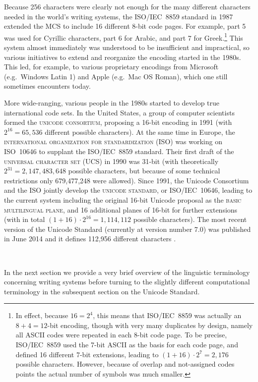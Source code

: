 Because 256 characters were clearly not enough for the many different characters
needed in the world's writing systems, the ISO/IEC~8859 standard in 1987
extended the MCS to include 16 different 8-bit code pages. For example, part 5
was used for Cyrillic characters, part 6 for Arabic, and part 7 for
Greek.\footnote{In effect, because $16 = 2^4$, this means that ISO/IEC~8859 was
actually an $8+4=12$-bit encoding, though with very many duplicates by design,
namely all ASCII codes were repeated in each 8-bit code page. To be precise,
ISO/IEC~8859 used the 7-bit ASCII as the basis for each code page, and defined
16 different 7-bit extensions, leading to $(1+16) \cdot {2^7} = 2,176$ possible
characters. However, because of overlap and not-assigned codes points the actual
number of symbols was much smaller.} This system almost immediately was
understood to be insufficient and impractical, so various initiatives to extend
and reorganize the encoding started in the 1980s. This led, for example, to
various proprietary encodings from Microsoft (e.g.~Windows Latin 1) and Apple
(e.g.~Mac OS Roman), which one still sometimes encounters today. 

More wide-ranging, various people in the 1980s started to develop true
international code sets. In the United States, a group of computer scientists
formed the \textsc{unicode consortium}, proposing a 16-bit encoding in 1991
(with $2^{16} = 65,536$ different possible characters). At the same time in
Europe, the \textsc{international organization for standardization} (ISO) was
working on ISO~10646 to supplant the ISO/IEC~8859 standard. Their first draft of
the \textsc{universal character set} (UCS) in 1990 was 31-bit (with
theoretically $2^{31} = 2,147,483,648$ possible characters, but because of some
technical restrictions only 679,477,248 were allowed). Since 1991, the Unicode
Consortium and the ISO jointly develop the \textsc{unicode standard}, or
ISO/IEC~10646, leading to the current system including the original 16-bit
Unicode proposal as the \textsc{basic multilingual plane}, and 16 additional
planes of 16-bit for further extensions (with in total $(1+16) \cdot 2^{16} =
1,114,112$ possible characters). The most recent version of the Unicode Standard
(currently at version number 7.0) was published in June 2014 and it defines
112,956 different characters \citep{Unicode2014}.

\ 

\noindent In the next section we provide a very brief overview of the linguistic
terminology concerning writing systems before turning to the slightly different
computational terminology in the subsequent section on the Unicode Standard. 

